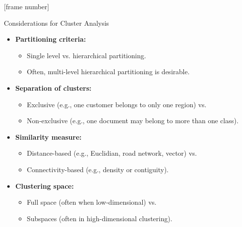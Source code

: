 \documentclass[aspectratio=169,t,xcolor=dvipsnames]{beamer}
\begin{document}
  {
    [frame number]
    \begin{frame}{Considerations for Cluster Analysis}
        \begin{itemize}
          \item \textbf{Partitioning criteria:}
          \begin{itemize}
            \item Single level vs. hierarchical partitioning.
            \item Often, multi-level hierarchical partitioning is desirable.
          \end{itemize}
          \item \textbf{Separation of clusters:}
          \begin{itemize}
            \item Exclusive (e.g., one customer belongs to only one region) vs.
            \item Non-exclusive (e.g., one document may belong to more than one class).
          \end{itemize}
          \item \textbf{Similarity measure:}
          \begin{itemize}
            \item Distance-based (e.g., Euclidian, road network, vector) vs.
            \item Connectivity-based (e.g., density or contiguity).
          \end{itemize}
          \item \textbf{Clustering space:}
          \begin{itemize}
            \item Full space (often when low-dimensional) vs.
            \item Subspaces (often in high-dimensional clustering).
          \end{itemize}
        \end{itemize}
    \end{frame}
  }
\end{document}
